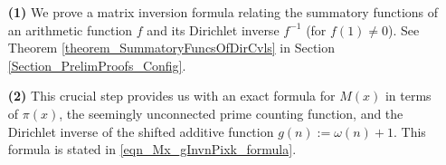 \documentclass[11pt,reqno,a4letter]{article}
\numberwithin{figure}{section}
\numberwithin{table}{section}
\theoremstyle{plain}
\numberwithin{theorem}{section}
\theoremstyle{definition}
\begin{document}
\begin{itemize} 

\item[\textbf{(1)}] We prove a matrix inversion formula relating the summatory 
           functions of an arithmetic function $f$ and its Dirichlet inverse $f^{-1}$ (for $f(1) \neq 0$). 
           See 
           Theorem \ref{theorem_SummatoryFuncsOfDirCvls} in 
           Section \ref{Section_PrelimProofs_Config}.  
\item[\textbf{(2)}] This crucial step provides us with an exact formula for $M(x)$ in terms of $\pi(x)$, the seemingly 
           unconnected prime counting function, and the 
           Dirichlet inverse of the shifted additive function $g(n) := \omega(n) + 1$. This 
           formula is stated in \eqref{eqn_Mx_gInvnPixk_formula}. 
           

\end{itemize}
\end{document}
